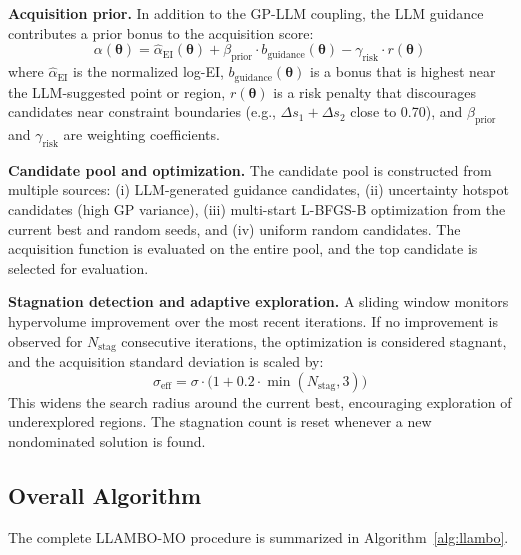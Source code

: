 \documentclass[lettersize,journal]{IEEEtran}
\begin{document}
\textbf{Acquisition prior.} In addition to the GP-LLM coupling, the LLM guidance contributes a prior bonus to the acquisition score:
\begin{equation}
\label{eq:acq_full}
\alpha(\boldsymbol{\theta}) = \hat{\alpha}_{\text{EI}}(\boldsymbol{\theta}) + \beta_{\text{prior}} \cdot b_{\text{guidance}}(\boldsymbol{\theta}) - \gamma_{\text{risk}} \cdot r(\boldsymbol{\theta})
\end{equation}
where $\hat{\alpha}_{\text{EI}}$ is the normalized log-EI, $b_{\text{guidance}}(\boldsymbol{\theta})$ is a bonus that is highest near the LLM-suggested point or region, $r(\boldsymbol{\theta})$ is a risk penalty that discourages candidates near constraint boundaries (e.g., $\Delta s_1 + \Delta s_2$ close to 0.70), and $\beta_{\text{prior}}$ and $\gamma_{\text{risk}}$ are weighting coefficients.

\textbf{Candidate pool and optimization.} The candidate pool is constructed from multiple sources: (i) LLM-generated guidance candidates, (ii) uncertainty hotspot candidates (high GP variance), (iii) multi-start L-BFGS-B optimization from the current best and random seeds, and (iv) uniform random candidates. The acquisition function is evaluated on the entire pool, and the top candidate is selected for evaluation.

\textbf{Stagnation detection and adaptive exploration.} A sliding window monitors hypervolume improvement over the most recent iterations. If no improvement is observed for $N_{\text{stag}}$ consecutive iterations, the optimization is considered stagnant, and the acquisition standard deviation is scaled by:
\begin{equation}
\label{eq:stag}
\sigma_{\text{eff}} = \sigma \cdot \bigl(1 + 0.2 \cdot \min(N_{\text{stag}}, 3)\bigr)
\end{equation}
This widens the search radius around the current best, encouraging exploration of underexplored regions. The stagnation count is reset whenever a new nondominated solution is found.

\subsection{Overall Algorithm}

The complete LLAMBO-MO procedure is summarized in Algorithm~\ref{alg:llambo}.
\end{document}
